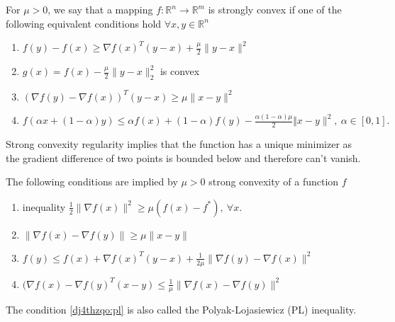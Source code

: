 \documentclass[varwidth=15cm, border=.5cm]{standalone}
\newcommand*\from{\colon}
\begin{document}
\begin{definition}[label=3rjrllrr, name=Strong Convexity Regularity]
	For \(\mu > 0\), we say that a mapping \( f\from\mathbb
	R^n\to\mathbb R^m \) is strongly convex if one of the following
	equivalent conditions hold \(\forall x,y\in\mathbb R^n\)

	\begin{enumerate}[label=\roman*\quad]
		\item \(f(y) - f(x) \geq \nabla f(x)^T(y-x) + \frac{\mu}{2}\lVert y - x\rVert^2\)
		\item \(g(x) = f(x) - \frac{\mu}{2}\lVert y-x\rVert^2_2\) is convex 
		\item \((\nabla f(y) - \nabla f(x))^T(y-x)\geq \mu\lVert x-y\rVert^2\)
		\item \(f(\alpha x+ (1-\alpha) y) \le \alpha f(x) + (1-\alpha) f(y) - \frac{\alpha (1-\alpha)\mu}{2}\Vert x-y\rVert^2,~\alpha \in [0,1].\)
	\end{enumerate}

	Strong convexity regularity implies that the function has a unique
	minimizer as the gradient difference of two points is bounded below and
	therefore can't vanish.

	\begin{remark}[label=dj4thzqo, name=Implications of Strong Convexity]
		The following conditions are implied by \(\mu>0\) strong
		convexity of a function $f$

		\begin{enumerate}[label=\roman*\quad,ref=(\roman*)]
			\item \label{dj4thzqo:pl} inequality \(\frac{1}{2}\lVert\nabla f(x)\rVert^2\ge \mu (f(x)-f^*),~\forall x.\) 
			\item \(\lVert\nabla f(x) - \nabla f(y)\rVert \ge \mu \lVert x-y\rVert\)
			\item \(f(y)\le f(x)+\nabla f(x)^T(y-x)+\frac{1}{2\mu}\lVert\nabla f(y)- \nabla f(x)\rVert^2\)
			\item \((\nabla f(x) - \nabla f(y)^T(x-y) \le \frac{1}{\mu} \lVert\nabla f(x)-\nabla f(y)\rVert^2\)
		\end{enumerate}

		The condition \ref{dj4thzqo:pl} is also called the 
		Polyak-Lojasiewicz (PL) inequality. 
	\end{remark}
\end{definition}
\end{document}

